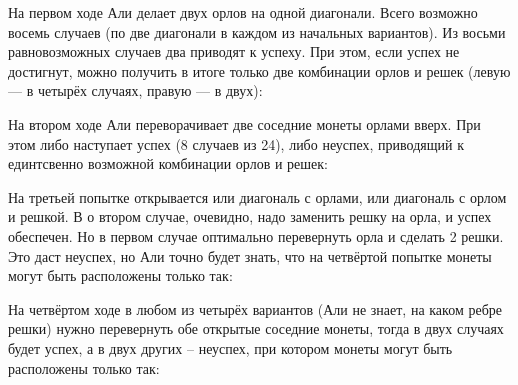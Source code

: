 \begin{enumerate}
\begin{enumerate}
На первом ходе Али делает двух орлов на одной диагонали. Всего возможно восемь
случаев (по две диагонали в каждом из начальных вариантов). Из восьми равновозможных
случаев два приводят к успеху. При этом, если успех не достигнут, можно получить в
итоге только две комбинации орлов и решек (левую — в четырёх случаях, правую — в двух):
\begin{center}
\end{center}

На втором ходе Али переворачивает две соседние монеты орлами вверх. При этом либо
наступает успех (8 случаев из 24), либо неуспех, приводящий к единтсвенно возможной
комбинации орлов и решек:
\begin{center}
\end{center}

На третьей попытке открывается или диагональ с орлами, или диагональ с орлом и решкой. В
о втором случае, очевидно, надо заменить решку на орла, и успех обеспечен. Но в первом
случае оптимально перевернуть орла и сделать 2 решки. Это даст неуспех, но Али точно
будет знать, что на четвёртой попытке монеты могут быть расположены только так:
\begin{center}
\end{center}

На четвёртом ходе в любом из четырёх вариантов (Али не знает, на каком ребре решки)
нужно перевернуть обе открытые соседние монеты, тогда в двух случаях будет успех,
а в двух других -- неуспех, при котором монеты могут быть расположены только так:
\begin{center}
\end{center}


\end{enumerate}
\end{enumerate}
